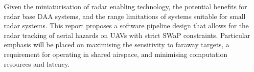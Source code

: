 Given the miniaturisation of radar enabling technology, the potential benefits for radar base DAA systems, and the range limitations of systems suitable for small radar systems. This report proposes a software pipeline design that allows for the radar tracking of aerial hazards on UAVs with strict SWaP constraints. Particular emphasis will be placed on maximising the sensitivity to faraway targets, a requirement for operating in shared airspace, and minimising computation resources and latency. 